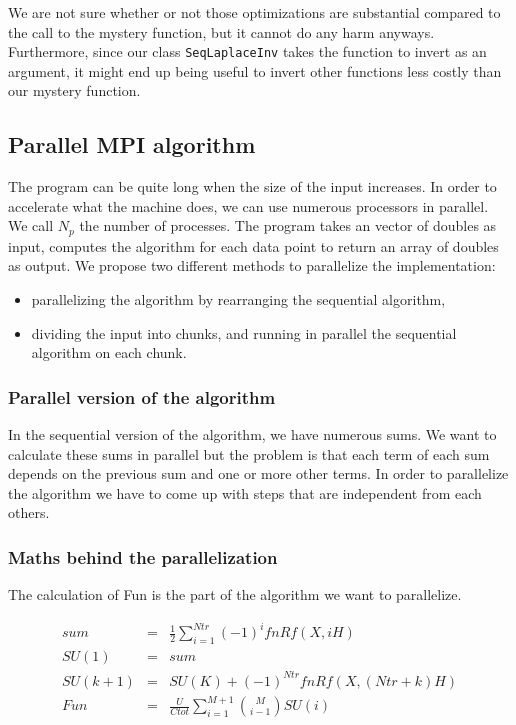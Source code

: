 \documentclass[11pt,a4paper]{article}
\begin{document}
We are not sure whether or not those optimizations are substantial compared to the call to the mystery function, but it cannot do any harm anyways. Furthermore, since our class \verb_SeqLaplaceInv_ takes the function to invert as an argument, it might end up being useful to invert other functions less costly than our mystery function.

\subsection{Parallel MPI algorithm}

The program can be quite long when the size of the input increases. In order to accelerate what the machine does, we can use numerous processors in parallel. We call $N_p$ the number of processes. The program takes an vector of doubles as input, computes the algorithm for each data point to return an array of doubles as output. We propose two different methods to parallelize the implementation:

\begin{itemize}

\item parallelizing the algorithm by rearranging the sequential algorithm,

\item dividing the input into chunks, and running in parallel the sequential algorithm on each chunk.

\end{itemize}

\subsubsection{Parallel version of the algorithm}

In the sequential version of the algorithm, we have numerous sums. We want to calculate these sums in parallel but the problem is that each term of each sum depends on the previous sum and one or more other terms. In order to parallelize the algorithm we have to come up with steps that are independent from each others.

\subsubsection*{Maths behind the parallelization}

The calculation of Fun is the part of the algorithm we want to parallelize.

\begin{eqnarray}
	sum &=& \frac{1}{2}   \sum_{i=1}^{Ntr} (-1)^{i}fnRf(X,iH)\\
	SU(1) &=& sum  \\
	SU(k + 1) &=& SU(K) + (-1)^{Ntr}fnRf(X,(Ntr + k)H) \label{SU(i)}\\
	Fun &=&\frac{U}{Ctot} \sum_{i=1}^{M+1} \binom{M}{i-1}SU(i) \label{Fun}
\end{eqnarray}
\end{document}
